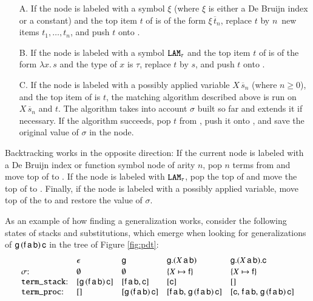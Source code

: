 \begin{enumerate}
\item[A.] If the node is labeled with a symbol $\xi$ (where
  $\xi$ is either a De Bruijn index or a constant) and the top item $t$
  of \tstack{} is of the form $\xi \, \overline{t}_n$, replace $t$ by
  $n$~new items $t_1,\dots,t_n$, and push $t$ onto \tproc{}.
\smallskip
\item[B.] If the node is labeled with a symbol $\texttt{LAM}_\tau$ and the top
  item $t$ of \tstack{} is of the form $\lambda x.\, s$ and the type of $x$ is
  $\tau$, replace $t$ by $s$, and push $t$ onto \tproc{}.
\smallskip
\item[C.] If the node is labeled with a possibly applied variable $X \, \overline{s}_n$
  (where $n \geq 0$), and the top item of \tstack{} is $t$, the 
  matching algorithm described above is run on $X \, \overline{s}_n$ and $t$.
  The algorithm takes into account $\sigma$ built so far and extends it
  if necessary. If the algorithm succeeds, pop $t$ from \tstack{}, push it onto \tproc{},
  and save the original value of $\sigma$ in the node.
\end{enumerate}
  
Backtracking works in the opposite direction: If the current node is labeled with a De
Bruijn index or function symbol node of arity $n$, pop $n$ terms from \tstack{} and move
top of \tproc{} to \tstack{}. If the node is labeled with
$\texttt{LAM}_\tau$, pop the top of \tstack{} and move the top of \tproc{} to
\tstack{}. Finally, if the node is labeled with a possibly applied variable, move top of the
\tproc{} to \tstack{} and restore the value of $\sigma$.

As an example of how finding a generalization works, consider the following
states of stacks and substitutions, which emerge when looking for generalizations of 
$\mathsf{g} \, (\mathsf{f} \, \mathsf{a} \, \mathsf{b}) \, \mathsf{c}$ in the tree of Figure \ref{fig:pdt}:
%
\[\begin{array}{@{}l@{\kern1em}l@{\kern1em}l@{\kern1em}l@{\kern1em}l@{}}
             & \epsilon                                                & \cst{g}                                                 & \cst{g}.(X \, \cst{a} \, \cst{b})                                                          & \cst{g}.(X \, \cst{a} \, \cst{b}).\cst{c} \\[.5\jot]
  \sigma{:}  & \emptyset                                               & \emptyset                                               & \{X \mapsto \cst{f}\}                                                                      & \{X \mapsto \cst{f}\} \\
  \tstack{:} & [\cst{g} \, (\cst{f} \, \cst{a} \, \cst{b}) \, \cst{c}] & [\cst{f} \, \cst{a} \, \cst{b}, \cst{c}]                & [\cst{c}]                                                                                  & [] \\
  \tproc{:}  & []                                                      & [\cst{g} \, (\cst{f} \, \cst{a} \, \cst{b}) \, \cst{c}] & [\cst{f} \, \cst{a} \, \cst{b}{,}\; \cst{g} \, (\cst{f} \, \cst{a} \, \cst{b}) \, \cst{c}] & [\cst{c}{,}\;\cst{f} \, \cst{a} \, \cst{b}{,}\; \cst{g} \, (\cst{f} \, \cst{a} \, \cst{b}) \, \cst{c}]
  \end{array}\]

